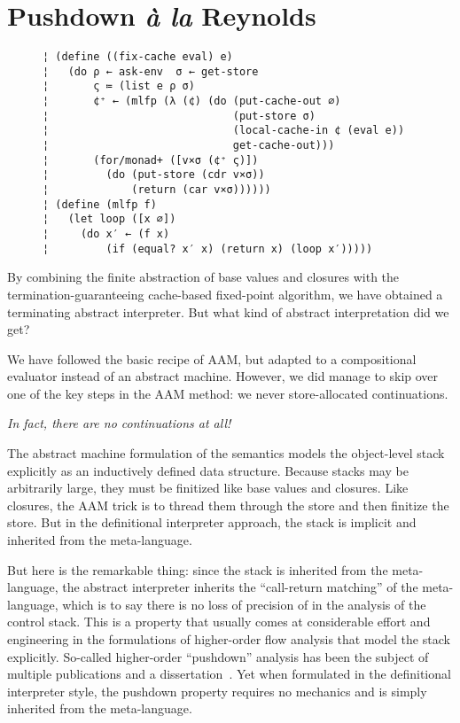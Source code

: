 \section{Pushdown \emph{à la} Reynolds}\label{s:reynolds}

\begin{figure} %
\begin{lstlisting}
¦ (define ((fix-cache eval) e)  
¦   (do ρ ← ask-env  σ ← get-store
¦       ς ≔ (list e ρ σ)
¦       ¢⁺ ← (mlfp (λ (¢) (do (put-cache-out ∅)
¦                             (put-store σ)
¦                             (local-cache-in ¢ (eval e))
¦                             get-cache-out)))
¦       (for/monad+ ([v×σ (¢⁺ ς)])
¦         (do (put-store (cdr v×σ))
¦             (return (car v×σ))))))
¦ (define (mlfp f)
¦   (let loop ([x ∅])
¦     (do x′ ← (f x)
¦         (if (equal? x′ x) (return x) (loop x′)))))
\end{lstlisting}
\label{f:fixing}
\end{figure} %

By combining the finite abstraction of base values and closures with the
termination-guaranteeing cache-based fixed-point algorithm, we have obtained a
terminating abstract interpreter.  But what kind of abstract interpretation did
we get?

We have followed the basic recipe of AAM, but adapted to a compositional
evaluator instead of an abstract machine.  However, we did manage to skip over
one of the key steps in the AAM method: we never store-allocated continuations.
\begin{center}
\emph{In fact, there are no continuations at all!}
\end{center}
The abstract machine formulation of the semantics models the object-level stack
explicitly as an inductively defined data structure.  Because stacks may be
arbitrarily large, they must be finitized like base values and closures.  Like
closures, the AAM trick is to thread them through the store and then finitize
the store.  But in the definitional interpreter approach, the stack is implicit
and inherited from the meta-language.

But here is the remarkable thing: since the stack is inherited from the
meta-language, the abstract interpreter inherits the ``call-return matching''
of the meta-language, which is to say there is no loss of precision of in the
analysis of the control stack.  This is a property that usually comes at
considerable effort and engineering in the formulations of higher-order flow
analysis that model the stack explicitly.  So-called higher-order ``pushdown''
analysis has been the subject of multiple publications and a
dissertation~\cite%
{dvanhorn:Vardoulakis2011CFA2%
,dvanhorn:Earl2010Pushdown%
,local:vardoulakis-diss12%
,dvanhorn:VanHorn2012Systematic%
,dvanhorn:Earl2012Introspective%
,dvanhorn:Johnson2014Abstracting%
,dvanhorn:Johnson2014Pushdown%
,local:p4f%
}. Yet when formulated in the definitional interpreter style, the pushdown
property requires no mechanics and is simply inherited from the meta-language.

